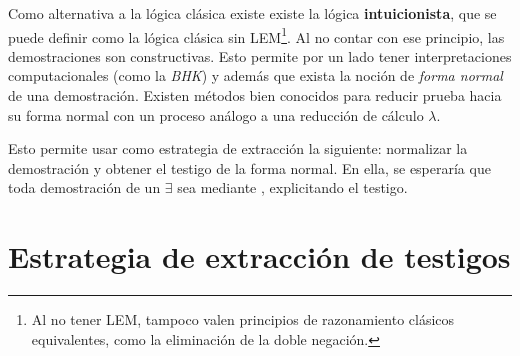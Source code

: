 Como alternativa a la lógica clásica existe existe la lógica
\textbf{intuicionista}, que se puede definir como la lógica clásica sin LEM\footnote{Al no tener LEM, tampoco valen principios de razonamiento clásicos equivalentes,
como la eliminación de la doble negación.}. Al
no contar con ese principio, las demostraciones son constructivas. Esto permite
por un lado tener interpretaciones computacionales (como la \textit{BHK}) y
además que exista la noción de \textit{forma normal} de una demostración.
Existen métodos bien conocidos para reducir prueba hacia su forma normal con un
proceso análogo a una reducción de cálculo $\lambda$. 

Esto permite usar como estrategia de extracción la siguiente: normalizar la
demostración y obtener el testigo de la forma normal. En ella, se esperaría que
toda demostración de un $\exists$ sea mediante , explicitando el
testigo.

\section{Estrategia de extracción de testigos}

